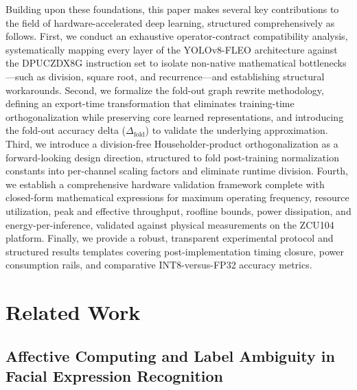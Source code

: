\documentclass[algorithms,article,submit,moreauthors]{Definitions/mdpi}
\begin{document}
Building upon these foundations, this paper makes several key contributions to the field of hardware-accelerated deep learning, structured comprehensively as follows. First, we conduct an exhaustive operator-contract compatibility analysis, systematically mapping every layer of the YOLOv8-FLEO architecture against the DPUCZDX8G instruction set to isolate non-native mathematical bottlenecks—such as division, square root, and recurrence—and establishing structural workarounds. Second, we formalize the fold-out graph rewrite methodology, defining an export-time transformation that eliminates training-time orthogonalization while preserving core learned representations, and introducing the fold-out accuracy delta ($\Delta_{\mathrm{fold}}$) to validate the underlying approximation. Third, we introduce a division-free Householder-product orthogonalization as a forward-looking design direction, structured to fold post-training normalization constants into per-channel scaling factors and eliminate runtime division. Fourth, we establish a comprehensive hardware validation framework complete with closed-form mathematical expressions for maximum operating frequency, resource utilization, peak and effective throughput, roofline bounds, power dissipation, and energy-per-inference, validated against physical measurements on the ZCU104 platform. Finally, we provide a robust, transparent experimental protocol and structured results templates covering post-implementation timing closure, power consumption rails, and comparative INT8-versus-FP32 accuracy metrics.



\section{Related Work} \label{sec:related}

\subsection{Affective Computing and Label Ambiguity in Facial Expression Recognition}
\end{document}
